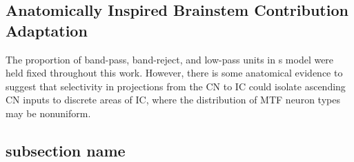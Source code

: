 \subsection{Anatomically Inspired Brainstem Contribution Adaptation} %
\label{sub:anatomically_inspired_brainstem_adaptation}
The proportion of band-pass, band-reject, and low-pass units in \citeauthor{Carney2015Speech}s model were held fixed throughout this work.  However, there is some anatomical evidence to suggest that selectivity in projections from the CN to IC could isolate ascending CN inputs to discrete areas of IC, where the distribution of MTF neuron types may be nonuniform.

\subsection{subsection name} %
\label{sub:subsection_name}




